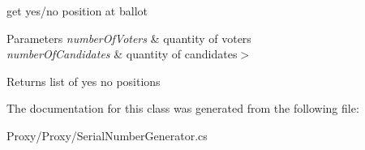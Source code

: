 get yes/no position at ballot 


\begin{DoxyParams}{Parameters}
{\em number\+Of\+Voters} & quantity of voters\\
\hline
{\em number\+Of\+Candidates} & quantity of candidates$>$\\
\hline
\end{DoxyParams}
\begin{DoxyReturn}{Returns}
list of yes no positions
\end{DoxyReturn}


The documentation for this class was generated from the following file\+:\begin{DoxyCompactItemize}
\item 
Proxy/\+Proxy/Serial\+Number\+Generator.\+cs\end{DoxyCompactItemize}
